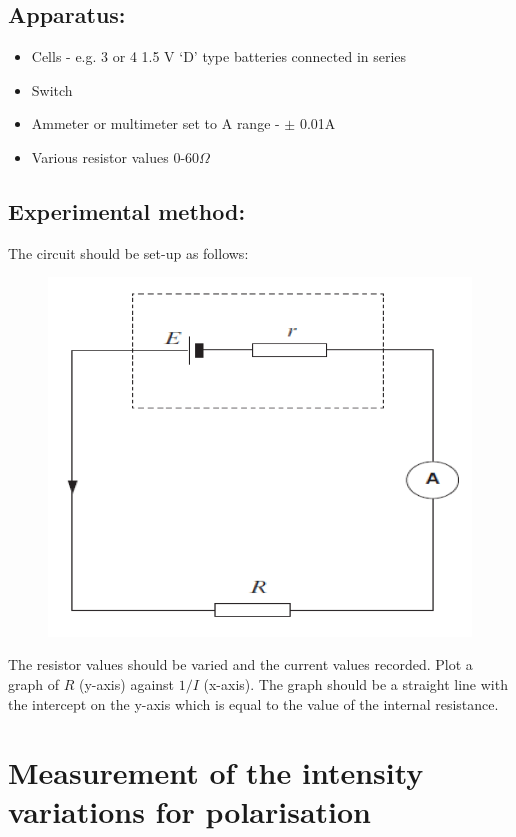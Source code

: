 \subsection{Apparatus:} 
\begin{itemize}
\item Cells - e.g. 3 or 4 1.5 V `D' type batteries connected in series
\item Switch 
\item Ammeter or multimeter set to A range - {$\pm$ 0.01}{A}
\item Various resistor values 0-60$\Omega$
\end{itemize}
\subsection{Experimental method:} 
The circuit should be set-up as follows:  
\begin{figure}
\includegraphics[width=\textwidth]{internalres.PNG}
\end{figure}

The resistor values should be varied and the current values recorded. Plot a graph of $R$  (y-axis) against $1/I$  (x-axis).  The graph should be a straight line with the intercept on the y-axis which is equal to the value of the internal resistance. 
\section{Measurement of the intensity variations for polarisation}
